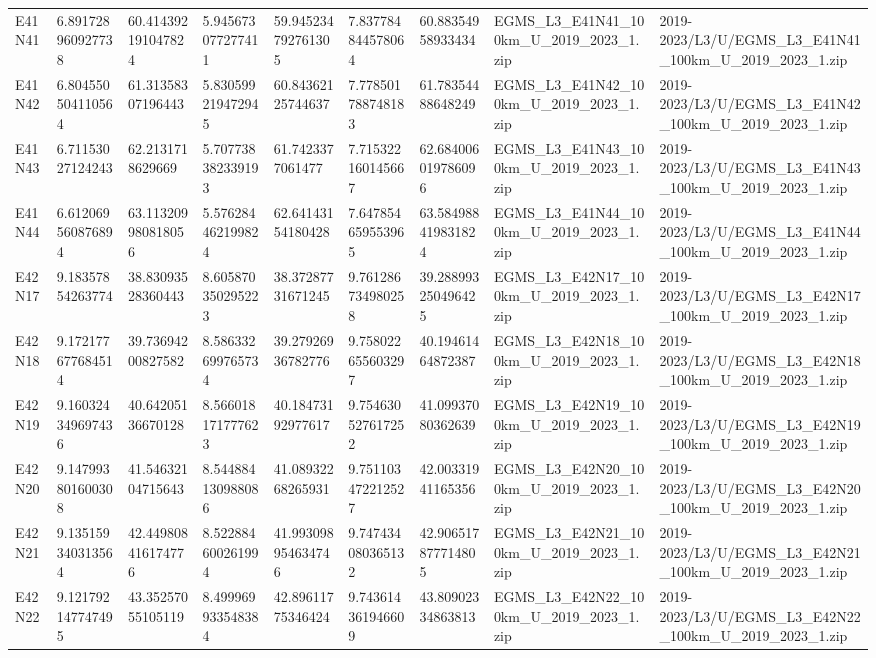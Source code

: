 \begin{landscape}
\begin{longtable}{lllllllll}
E41N41 & 6.891728960927738 & 60.414392191047824 & 5.945673077277411 & 59.945234792761305 & 7.837784844578064 & 60.88354958933434 & EGMS\_L3\_E41N41\_100km\_U\_2019\_2023\_1.zip & 2019-2023/L3/U/EGMS\_L3\_E41N41\_100km\_U\_2019\_2023\_1.zip \\
E41N42 & 6.804550504110564 & 61.31358307196443 & 5.830599219472945 & 60.84362125744637 & 7.778501788748183 & 61.78354488648249 & EGMS\_L3\_E41N42\_100km\_U\_2019\_2023\_1.zip & 2019-2023/L3/U/EGMS\_L3\_E41N42\_100km\_U\_2019\_2023\_1.zip \\
E41N43 & 6.71153027124243 & 62.2131718629669 & 5.707738382339193 & 61.7423377061477 & 7.715322160145667 & 62.684006019786096 & EGMS\_L3\_E41N43\_100km\_U\_2019\_2023\_1.zip & 2019-2023/L3/U/EGMS\_L3\_E41N43\_100km\_U\_2019\_2023\_1.zip \\
E41N44 & 6.612069560876894 & 63.113209980818056 & 5.576284462199824 & 62.64143154180428 & 7.647854659553965 & 63.584988419831824 & EGMS\_L3\_E41N44\_100km\_U\_2019\_2023\_1.zip & 2019-2023/L3/U/EGMS\_L3\_E41N44\_100km\_U\_2019\_2023\_1.zip \\
E42N17 & 9.18357854263774 & 38.83093528360443 & 8.605870350295223 & 38.37287731671245 & 9.761286734980258 & 39.288993250496425 & EGMS\_L3\_E42N17\_100km\_U\_2019\_2023\_1.zip & 2019-2023/L3/U/EGMS\_L3\_E42N17\_100km\_U\_2019\_2023\_1.zip \\
E42N18 & 9.172177677684514 & 39.73694200827582 & 8.586332699765734 & 39.27926936782776 & 9.758022655603297 & 40.19461464872387 & EGMS\_L3\_E42N18\_100km\_U\_2019\_2023\_1.zip & 2019-2023/L3/U/EGMS\_L3\_E42N18\_100km\_U\_2019\_2023\_1.zip \\
E42N19 & 9.160324349697436 & 40.64205136670128 & 8.566018171777623 & 40.18473192977617 & 9.754630527617252 & 41.09937080362639 & EGMS\_L3\_E42N19\_100km\_U\_2019\_2023\_1.zip & 2019-2023/L3/U/EGMS\_L3\_E42N19\_100km\_U\_2019\_2023\_1.zip \\
E42N20 & 9.147993801600308 & 41.54632104715643 & 8.544884130988086 & 41.08932268265931 & 9.751103472212527 & 42.00331941165356 & EGMS\_L3\_E42N20\_100km\_U\_2019\_2023\_1.zip & 2019-2023/L3/U/EGMS\_L3\_E42N20\_100km\_U\_2019\_2023\_1.zip \\
E42N21 & 9.135159340313564 & 42.449808416174776 & 8.522884600261994 & 41.993098954634746 & 9.747434080365132 & 42.906517877714805 & EGMS\_L3\_E42N21\_100km\_U\_2019\_2023\_1.zip & 2019-2023/L3/U/EGMS\_L3\_E42N21\_100km\_U\_2019\_2023\_1.zip \\
E42N22 & 9.121792147747495 & 43.35257055105119 & 8.499969933548384 & 42.89611775346424 & 9.743614361946609 & 43.80902334863813 & EGMS\_L3\_E42N22\_100km\_U\_2019\_2023\_1.zip & 2019-2023/L3/U/EGMS\_L3\_E42N22\_100km\_U\_2019\_2023\_1.zip \\

\end{longtable}
\end{landscape}
